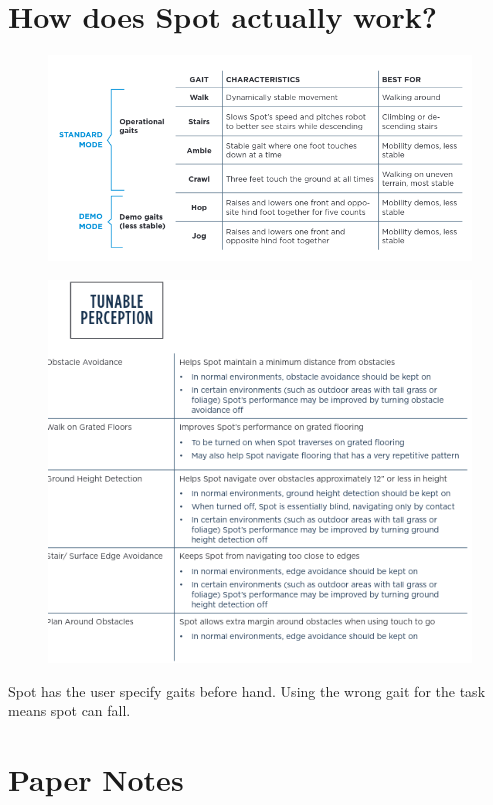 \documentclass{article}
\theoremstyle{definition}
\theoremstyle{note}
\begin{document}
\section{How does Spot actually work?}
\begin{figure}[ht]
    \centering
    \includegraphics[scale=0.4]{./figures/screenshot.png}
\end{figure}
\begin{figure}[ht]
    \centering
    \includegraphics[scale=0.4]{./figures/screenshot2.png}
\end{figure}
Spot has the user specify gaits before hand. Using the wrong gait for the task means spot can fall.



\section{Paper Notes}
\end{document}
